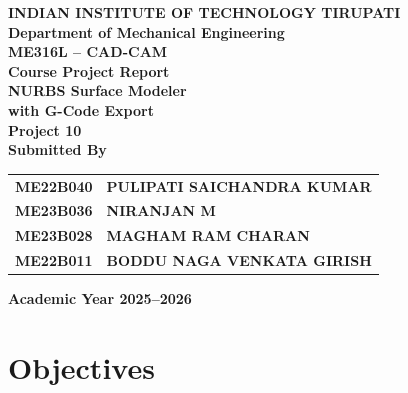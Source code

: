 \documentclass[a4paper,12pt]{article}
\begin{document}
\begin{titlepage}
  \centering
  \vspace*{0.6cm}

  {\Large\bfseries INDIAN INSTITUTE OF TECHNOLOGY TIRUPATI}\\[0.3cm]
  {\large\bfseries Department of Mechanical Engineering}\\[1.4cm]

  {\large\bfseries ME316L -- CAD-CAM}\\[0.2cm]
  {\Large\bfseries Course Project Report}\\[1.0cm]

  {\LARGE\bfseries NURBS Surface Modeler}\\[0.25cm]
  {\Large\bfseries with G-Code Export}\\[1.4cm]

  {\large\bfseries Project 10}\\[1.6cm]

  {\large\bfseries Submitted By}\\[0.6cm]

  \begin{tabular}{>{\bfseries}l >{\bfseries}l}
    ME22B040 & PULIPATI SAICHANDRA KUMAR       \\[4pt]
    ME23B036 & NIRANJAN M                      \\[4pt]
    ME23B028 & MAGHAM RAM CHARAN               \\[4pt]
    ME22B011 & BODDU NAGA VENKATA GIRISH       \\
  \end{tabular}

  \vfill
  {\small\bfseries Academic Year 2025--2026}
\end{titlepage}

\clearpage

\renewcommand{\contentsname}{\Large\bfseries Contents}
\tableofcontents
\clearpage

\section{Objectives}
\end{document}
